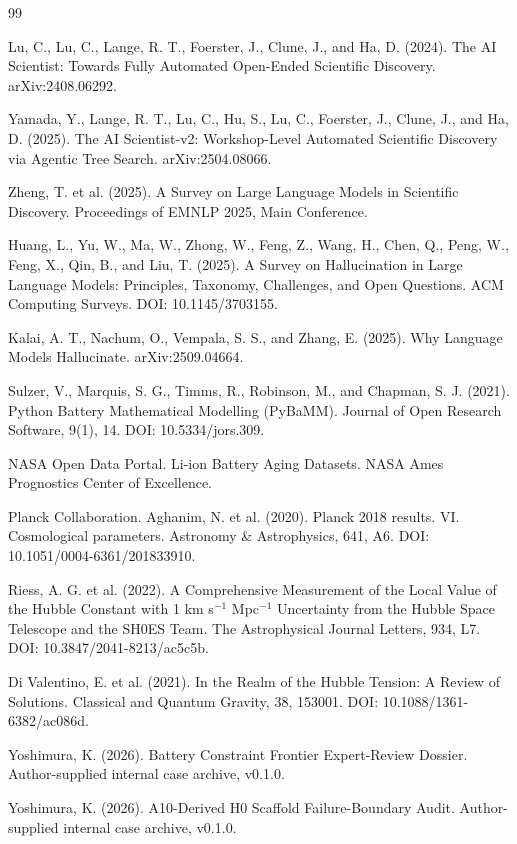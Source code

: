 \documentclass[a4paper,11pt]{article}
\begin{document}
\begin{thebibliography}{99}

Lu, C., Lu, C., Lange, R. T., Foerster, J., Clune, J., and Ha, D. (2024). The AI Scientist: Towards Fully Automated Open-Ended Scientific Discovery. arXiv:2408.06292.

Yamada, Y., Lange, R. T., Lu, C., Hu, S., Lu, C., Foerster, J., Clune, J., and Ha, D. (2025). The AI Scientist-v2: Workshop-Level Automated Scientific Discovery via Agentic Tree Search. arXiv:2504.08066.

Zheng, T. et al. (2025). A Survey on Large Language Models in Scientific Discovery. Proceedings of EMNLP 2025, Main Conference.

Huang, L., Yu, W., Ma, W., Zhong, W., Feng, Z., Wang, H., Chen, Q., Peng, W., Feng, X., Qin, B., and Liu, T. (2025). A Survey on Hallucination in Large Language Models: Principles, Taxonomy, Challenges, and Open Questions. ACM Computing Surveys. DOI: 10.1145/3703155.

Kalai, A. T., Nachum, O., Vempala, S. S., and Zhang, E. (2025). Why Language Models Hallucinate. arXiv:2509.04664.

Sulzer, V., Marquis, S. G., Timms, R., Robinson, M., and Chapman, S. J. (2021). Python Battery Mathematical Modelling (PyBaMM). Journal of Open Research Software, 9(1), 14. DOI: 10.5334/jors.309.

NASA Open Data Portal. Li-ion Battery Aging Datasets. NASA Ames Prognostics Center of Excellence.

Planck Collaboration. Aghanim, N. et al. (2020). Planck 2018 results. VI. Cosmological parameters. Astronomy \& Astrophysics, 641, A6. DOI: 10.1051/0004-6361/201833910.

Riess, A. G. et al. (2022). A Comprehensive Measurement of the Local Value of the Hubble Constant with 1 km s$^{-1}$ Mpc$^{-1}$ Uncertainty from the Hubble Space Telescope and the SH0ES Team. The Astrophysical Journal Letters, 934, L7. DOI: 10.3847/2041-8213/ac5c5b.

Di Valentino, E. et al. (2021). In the Realm of the Hubble Tension: A Review of Solutions. Classical and Quantum Gravity, 38, 153001. DOI: 10.1088/1361-6382/ac086d.

Yoshimura, K. (2026). Battery Constraint Frontier Expert-Review Dossier. Author-supplied internal case archive, v0.1.0.

Yoshimura, K. (2026). A10-Derived H0 Scaffold Failure-Boundary Audit. Author-supplied internal case archive, v0.1.0.

\end{thebibliography}
\end{document}
